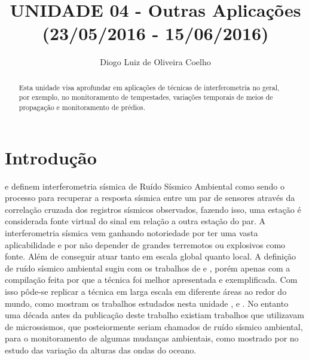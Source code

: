 \documentclass[paper,twocolumn]{geophysics}
\begin{document}
\title{{UNIDADE 04 - Outras Aplicações (23/05/2016 - 15/06/2016)}}

\address{\footnotemark[1] Universidade Federal do Rio Grande do Norte - UFRN
Centro de Ciências Exatas e da Terra - CCET
Departamento de Geofísica
Campus Universitário - Lagoa Nova
59072-970 Natal, RN
}
\author{Diogo Luiz de Oliveira Coelho\footnotemark[1]}


\begin{abstract}
{Esta unidade visa aprofundar em aplicações de técnicas de interferometria no geral, por exemplo, no monitoramento de tempestades, variações temporais de meios de propagação e monitoramento de prédios.}  
\end{abstract}

\section*{Introdução}

\cite{wapenaar_tutorial_2010} e \cite{boullenger_studying_2015} definem interferometria sísmica de Ruído Sísmico Ambiental como sendo o processo para recuperar a resposta sísmica entre um par de sensores através da correlação cruzada dos registros sísmicos observados, fazendo isso, uma estação é considerada fonte virtual do sinal em relação a outra estação do par. A interferometria sísmica vem ganhando notoriedade por ter uma vasta aplicabilidade e por não depender de grandes terremotos ou explosivos como fonte. Além de conseguir atuar tanto em escala global quanto local. A definição de ruído sísmico ambiental sugiu com os trabalhos de \cite{campillo_long-range_2003} e \cite{shapiro_emergence_2004}, porém apenas com a compilação feita por \cite{wapenaar_tutorial_2010} que a técnica foi melhor apresentada e exemplificada. Com isso pôde-se replicar a técnica em larga escala em diferente áreas ao redor do mundo, como mostram os trabalhos estudados nesta unidade \cite{zaccarelli_variations_2011}, \cite{boullenger_studying_2015} e \cite{nakata_damage_2015}. No entanto uma década antes da publicação deste trabalho existiam trabalhos que utilizavam de microssismos, que posteiormente seriam chamados de ruído sísmico ambiental, para o monitoramento de algumas mudanças ambientais, como mostrado por \cite{bromirski_ocean_1999} no estudo das variação da alturas das ondas do oceano. 
\end{document}
